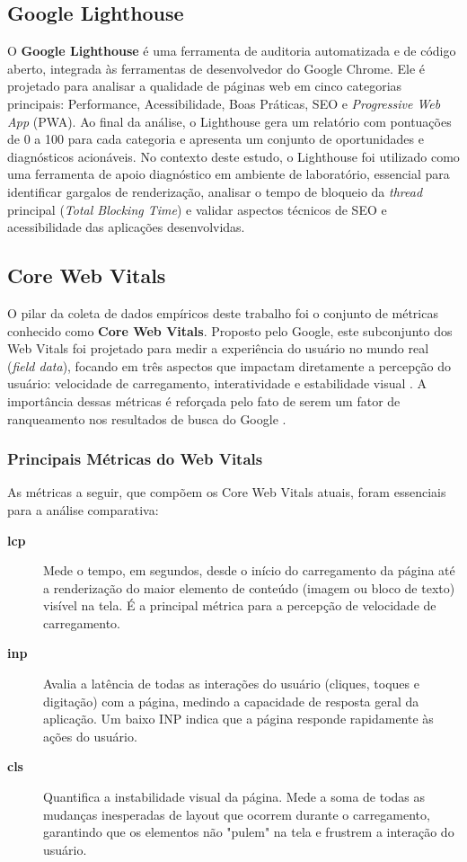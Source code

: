\subsection{Google Lighthouse}
\label{subsec:google-lighthouse}
O \textbf{Google Lighthouse} é uma ferramenta de auditoria automatizada e de código aberto, integrada às ferramentas de desenvolvedor do Google Chrome. Ele é projetado para analisar a qualidade de páginas web em cinco categorias principais: Performance, Acessibilidade, Boas Práticas, SEO e \textit{Progressive Web App} (PWA). Ao final da análise, o Lighthouse gera um relatório com pontuações de 0 a 100 para cada categoria e apresenta um conjunto de oportunidades e diagnósticos acionáveis. No contexto deste estudo, o Lighthouse foi utilizado como uma ferramenta de apoio diagnóstico em ambiente de laboratório, essencial para identificar gargalos de renderização, analisar o tempo de bloqueio da \textit{thread} principal (\textit{Total Blocking Time}) e validar aspectos técnicos de SEO e acessibilidade das aplicações desenvolvidas.

\subsection{Core Web Vitals}
\label{subsec:core-web-vitals}
O pilar da coleta de dados empíricos deste trabalho foi o conjunto de métricas conhecido como \textbf{Core Web Vitals}. Proposto pelo Google, este subconjunto dos Web Vitals foi projetado para medir a experiência do usuário no mundo real (\textit{field data}), focando em três aspectos que impactam diretamente a percepção do usuário: velocidade de carregamento, interatividade e estabilidade visual \cite{osmani2025}. A importância dessas métricas é reforçada pelo fato de serem um fator de ranqueamento nos resultados de busca do Google \cite{google_cwv_search}.

\subsubsection{Principais Métricas do Web Vitals}
As métricas a seguir, que compõem os Core Web Vitals atuais, foram essenciais para a análise comparativa:
\begin{description}
    \item[\textbf{\acrfull{lcp}}] Mede o tempo, em segundos, desde o início do carregamento da página até a renderização do maior elemento de conteúdo (imagem ou bloco de texto) visível na tela. É a principal métrica para a percepção de velocidade de carregamento.
    \item[\textbf{\acrfull{inp}}] Avalia a latência de todas as interações do usuário (cliques, toques e digitação) com a página, medindo a capacidade de resposta geral da aplicação. Um baixo INP indica que a página responde rapidamente às ações do usuário.
    \item[\textbf{\acrfull{cls}}] Quantifica a instabilidade visual da página. Mede a soma de todas as mudanças inesperadas de layout que ocorrem durante o carregamento, garantindo que os elementos não "pulem" na tela e frustrem a interação do usuário.
\end{description}

